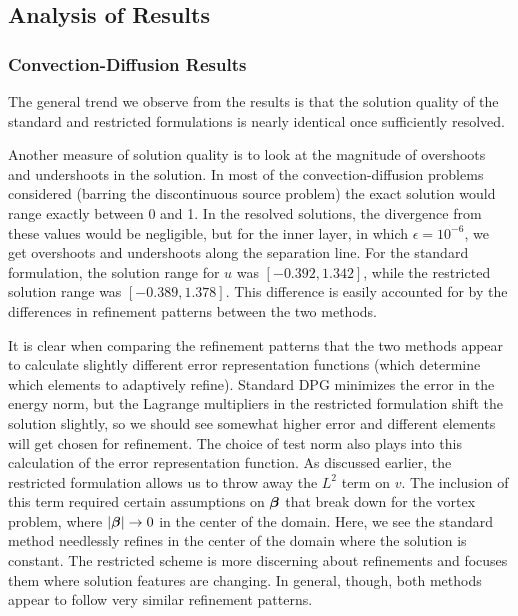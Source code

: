 \documentclass[Proposal.tex]{subfiles}
\begin{document}
\subsection{Analysis of Results}\label{sec:problemAnalysis}
\subsubsection{Convection-Diffusion Results}
The general trend we observe from the results is that the solution quality
of the standard and restricted formulations is nearly identical once
sufficiently resolved.

Another measure of solution quality is to look at the magnitude of overshoots
and undershoots in the solution. In most of the convection-diffusion problems considered (barring
the discontinuous source problem) the exact solution would range exactly
between 0 and 1. In the resolved solutions, the divergence from these values
would be negligible, but for the inner layer, in which $\epsilon=10^{-6}$, we
get overshoots and undershoots along the separation line. For the
standard formulation, the solution range for $u$ was $[-0.392,1.342]$,
while the restricted solution range was $[-0.389,1.378]$. This difference is
easily accounted for by the differences in refinement patterns between the two
methods.

It is clear when comparing the refinement patterns that the two methods appear
to calculate slightly different error representation functions (which
determine which elements to adaptively refine). Standard DPG minimizes the
error in the energy norm, but the Lagrange multipliers in the restricted
formulation shift the solution slightly, so we should see somewhat higher
error and different elements will get chosen for refinement. The choice of
test norm also plays into this calculation of the error representation
function. As discussed earlier, the restricted formulation allows us to
throw away the $L^2$ term on $v$. The inclusion of this term required certain
assumptions on $\boldsymbol\beta$ \cite{ChanHeuerThanhDemkowicz2012} that break down for
the vortex problem, where $\left| \boldsymbol\beta \right|\rightarrow 0$ in the center of the domain. 
Here, we see the standard method needlessly refines
in the center of the domain where the solution is constant. The restricted
scheme is more discerning about refinements and focuses them where
solution features are changing. In general, though, both methods appear to
follow very similar refinement patterns.
\end{document}
